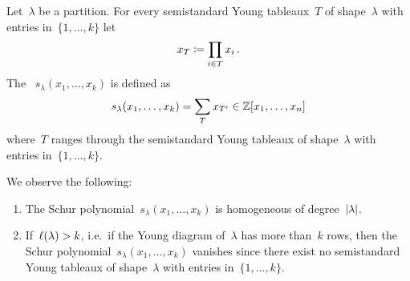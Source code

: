 \documentclass[a4paper,10pt]{scrartcl}
\begin{document}
\begin{example}
  Let~$\lambda$ be a partition.
  For every semistandard Young tableaux~$T$ of shape~$\lambda$ with entries in~$\{1, \dotsc, k\}$ let
  \[
    x_T
    \coloneqq
    \prod_{i \in T} x_i \,.
  \]
  The ~$s_\lambda(x_1, \dotsc, x_k)$ is defined as
  \[
    s_\lambda(x_1, \dotsc, x_k)
    =
    \sum_{T} x_{T'}
    \in
    \mathbb{Z}[x_1, \dotsc, x_n]
  \]
  where~$T$ ranges through the semistandard Young tableaux of shape~$\lambda$ with entries in~$\{1, \dotsc, k\}$.
  
  We observe the following:
  \begin{enumerate}
    \item
      The Schur polynomial~$s_\lambda(x_1, \dotsc, x_k)$ is homogeneous of degree~$\lvert\lambda\rvert$.
    \item
      If~$\operatorname{\ell}(\lambda) > k$, i.e.\ if the Young diagram of~$\lambda$ has more than~$k$ rows, then the Schur polynomial~$s_\lambda(x_1, \dotsc, x_k)$ vanishes since there exist no semistandard Young tableaux of shape~$\lambda$ with entries in~$\{1, \dotsc, k\}$.

\end{enumerate}
\end{example}
\end{document}
